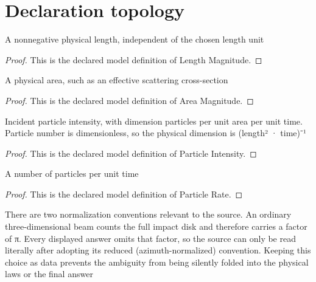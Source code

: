 \section{Declaration topology}
\begin{definition}
  \label{def:physics:phyx-mini-0562:phyxminiproblems-problemphyxmini0562-lengthmagnitude}
  A nonnegative physical length, independent of the chosen length unit
\end{definition}
\begin{proof}
  This is the declared model definition of Length Magnitude.
\end{proof}
\begin{definition}
  \label{def:physics:phyx-mini-0562:phyxminiproblems-problemphyxmini0562-areamagnitude}
  A physical area, such as an effective scattering cross-section
\end{definition}
\begin{proof}
  This is the declared model definition of Area Magnitude.
\end{proof}
\begin{definition}
  \label{def:physics:phyx-mini-0562:phyxminiproblems-problemphyxmini0562-particleintensity}
  Incident particle intensity, with dimension particles per unit area per unit time. Particle number is dimensionless, so the physical dimension is (length² · time)⁻¹
\end{definition}
\begin{proof}
  This is the declared model definition of Particle Intensity.
\end{proof}
\begin{definition}
  \label{def:physics:phyx-mini-0562:phyxminiproblems-problemphyxmini0562-particlerate}
  A number of particles per unit time
\end{definition}
\begin{proof}
  This is the declared model definition of Particle Rate.
\end{proof}
\begin{definition}
  \label{def:physics:phyx-mini-0562:phyxminiproblems-problemphyxmini0562-crosssectionnormalization}
  There are two normalization conventions relevant to the source. An ordinary three-dimensional beam counts the full impact disk and therefore carries a factor of π. Every displayed answer omits that factor, so the source can only be read literally after adopting its reduced (azimuth-normalized) convention. Keeping this choice as data prevents the ambiguity from being silently folded into the physical laws or the final answer
\end{definition}
